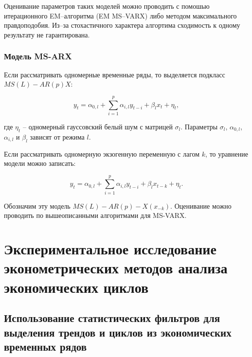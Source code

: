 \documentclass[a4paper,14pt]{extreport}
\begin{document}
	Оценивание параметров таких моделей можно проводить с помошью итерационного EM–алгоритма (EM MS–VARX) \cite{malNovopMSVARX} либо методом максимального правдоподобия. Из–за стохастичного характера алгортима сходимость к одному результату не гарантирована.
	
	
	\subsection{Модель MS-ARX}
	
	Если рассматривать одномерные временные ряды, то выделяется подкласс $MS(L)-AR(p)X$:
	
	\begin{equation}  
	y_{t} = \alpha_{0,l} + \sum_{i=1}^{p} \alpha_{i,l} y_{t-i} + \beta_{l} x_{t} + \eta_{t},
	\end{equation}
	
	где $\eta_{t}$ – одномерный гауссовский белый шум с матрицей $\sigma_{l}$. Параметры $\sigma_{l}$, $\alpha_{0,l}$, $\alpha_{i,l}$ и $\beta_{l}$ зависят от режима $l$.
	
	Если рассматривать одномерную экзогенную переменную с лагом $k$, то уравнение модели можно записать:
	
	\begin{equation}  
	\label{eq:gen-msarx}
	y_{t} = \alpha_{0,l} + \sum_{i=1}^{p} \alpha_{i,l} y_{t-i} + \beta_{l} x_{t-k} + \eta_{t}.
	\end{equation}
	
	Обозначим эту модель $MS(L)-AR(p)-X({x}_{-k})$. Оценивание можно проводить по вышеописанными алгоритмами для MS-VARX.
	
	
	\chapter{Экспериментальное исследование эконометрических методов анализа экономических циклов}
	
	
	\section{Использование статистических фильтров для выделения трендов и циклов из экономических временных рядов}
	
\end{document}
